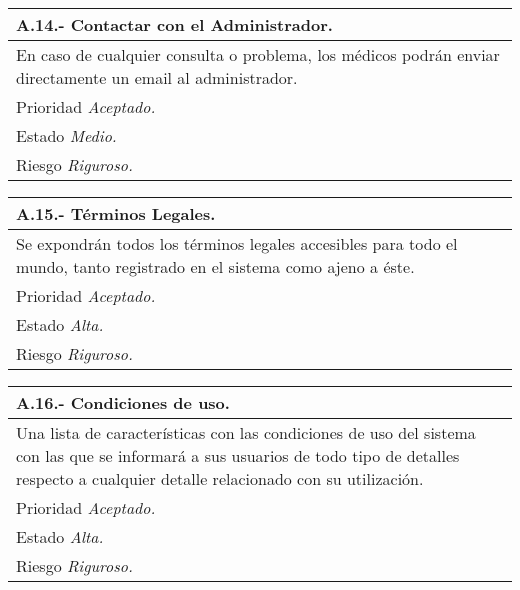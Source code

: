 \documentclass[a4paper,oneside,11pt]{book}
\begin{document}
\begin{center}
\begin{tabulary}{15cm}{|L|}
	\hline
		\bf{A.14.- Contactar con el Administrador.} \\
	\hline
		En caso de cualquier consulta o problema, los médicos podrán enviar directamente un email al administrador. \\
	\hline
		Prioridad \textit{Aceptado.} \\
	\hline
		Estado \textit{Medio.} \\
	\hline
		Riesgo \textit{Riguroso.} \\
	\hline
\end{tabulary}
\end{center}

\begin{center}
\begin{tabulary}{15cm}{|L|}
	\hline
		\bf{A.15.- Términos Legales.} \\
	\hline
		Se expondrán todos los términos legales accesibles para todo el mundo, tanto registrado en el sistema como ajeno a éste. \\
	\hline
		Prioridad \textit{Aceptado.} \\
	\hline
		Estado \textit{Alta.} \\
	\hline
		Riesgo \textit{Riguroso.} \\
	\hline
\end{tabulary}
\end{center}

\begin{center}
\begin{tabulary}{15cm}{|L|}
	\hline
		\bf{A.16.- Condiciones de uso.} \\
	\hline
		Una lista de características con las condiciones de uso del sistema con las que se informará a sus usuarios de todo tipo de detalles respecto a cualquier detalle relacionado con su utilización. \\
	\hline
		Prioridad \textit{Aceptado.} \\
	\hline
		Estado \textit{Alta.} \\
	\hline
		Riesgo \textit{Riguroso.} \\
	\hline
\end{tabulary}
\end{center}
\end{document}
